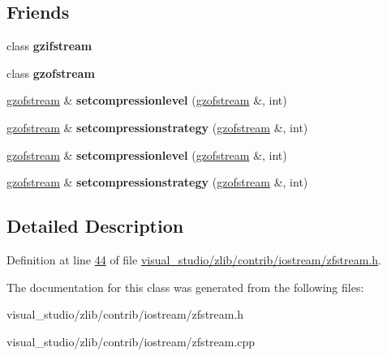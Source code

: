 \subsection*{Friends}
\begin{DoxyCompactItemize}
\item 
\mbox{\label{classgzfilestream__common_a2cd05673d8ce9653cebf9f8759d1e333}} 
class {\bfseries gzifstream}
\item 
\mbox{\label{classgzfilestream__common_af699cdb3a2980e543c4a4ecc5b8fd586}} 
class {\bfseries gzofstream}
\item 
\mbox{\label{classgzfilestream__common_a3351bd2cbcd5eedea805dfbf996f4236}} 
\hyperlink{classgzofstream}{gzofstream} \& {\bfseries setcompressionlevel} (\hyperlink{classgzofstream}{gzofstream} \&, int)
\item 
\mbox{\label{classgzfilestream__common_a37083e69bcbb72fd74685473a21eaa87}} 
\hyperlink{classgzofstream}{gzofstream} \& {\bfseries setcompressionstrategy} (\hyperlink{classgzofstream}{gzofstream} \&, int)
\item 
\mbox{\label{classgzfilestream__common_a3351bd2cbcd5eedea805dfbf996f4236}} 
\hyperlink{classgzofstream}{gzofstream} \& {\bfseries setcompressionlevel} (\hyperlink{classgzofstream}{gzofstream} \&, int)
\item 
\mbox{\label{classgzfilestream__common_a37083e69bcbb72fd74685473a21eaa87}} 
\hyperlink{classgzofstream}{gzofstream} \& {\bfseries setcompressionstrategy} (\hyperlink{classgzofstream}{gzofstream} \&, int)
\end{DoxyCompactItemize}


\subsection{Detailed Description}


Definition at line \hyperlink{visual__studio_2zlib_2contrib_2iostream_2zfstream_8h_source_l00044}{44} of file \hyperlink{visual__studio_2zlib_2contrib_2iostream_2zfstream_8h_source}{visual\+\_\+studio/zlib/contrib/iostream/zfstream.\+h}.



The documentation for this class was generated from the following files\+:\begin{DoxyCompactItemize}
\item 
visual\+\_\+studio/zlib/contrib/iostream/zfstream.\+h\item 
visual\+\_\+studio/zlib/contrib/iostream/zfstream.\+cpp\end{DoxyCompactItemize}
